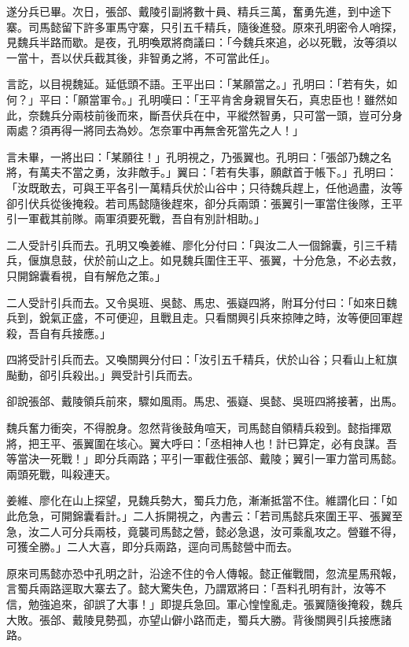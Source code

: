 遂分兵已畢。次日，張郃、戴陵引副將數十員、精兵三萬，奮勇先進，到中途下寨。司馬懿留下許多軍馬守寨，只引五千精兵，隨後進發。原來孔明密令人哨探，見魏兵半路而歇。是夜，孔明喚眾將商議曰：「今魏兵來追，必以死戰，汝等須以一當十，吾以伏兵截其後，非智勇之將，不可當此任」。

言訖，以目視魏延。延低頭不語。王平出曰：「某願當之。」孔明曰：「若有失，如何？」平曰：「願當軍令。」孔明嘆曰：「王平肯舍身親冒矢石，真忠臣也！雖然如此，奈魏兵分兩枝前後而來，斷吾伏兵在中，平縱然智勇，只可當一頭，豈可分身兩處？須再得一將同去為妙。怎奈軍中再無舍死當先之人！」

言未畢，一將出曰：「某願往！」孔明視之，乃張翼也。孔明曰：「張郃乃魏之名將，有萬夫不當之勇，汝非敵手。」翼曰：「若有失事，願獻首于帳下。」孔明曰：「汝既敢去，可與王平各引一萬精兵伏於山谷中；只待魏兵趕上，任他過盡，汝等卻引伏兵從後掩殺。若司馬懿隨後趕來，卻分兵兩頭：張翼引一軍當住後隊，王平引一軍截其前隊。兩軍須要死戰，吾自有別計相助。」

二人受計引兵而去。孔明又喚姜維、廖化分付曰：「與汝二人一個錦囊，引三千精兵，偃旗息鼓，伏於前山之上。如見魏兵圍住王平、張翼，十分危急，不必去救，只開錦囊看視，自有解危之策。」

二人受計引兵而去。又令吳班、吳懿、馬忠、張嶷四將，附耳分付曰：「如來日魏兵到，銳氣正盛，不可便迎，且戰且走。只看關興引兵來掠陣之時，汝等便回軍趕殺，吾自有兵接應。」

四將受計引兵而去。又喚關興分付曰：「汝引五千精兵，伏於山谷；只看山上紅旗颭動，卻引兵殺出。」興受計引兵而去。

卻說張郃、戴陵領兵前來，驟如風雨。馬忠、張嶷、吳懿、吳班四將接著，出馬。

魏兵奮力衝突，不得脫身。忽然背後鼓角喧天，司馬懿自領精兵殺到。懿指揮眾將，把王平、張翼圍在垓心。翼大呼曰：「丞相神人也！計已算定，必有良謀。吾等當決一死戰！」即分兵兩路；平引一軍截住張郃、戴陵；翼引一軍力當司馬懿。兩頭死戰，叫殺連天。

姜維、廖化在山上探望，見魏兵勢大，蜀兵力危，漸漸抵當不住。維謂化曰：「如此危急，可開錦囊看計。」二人拆開視之，內書云：「若司馬懿兵來圍王平、張翼至急，汝二人可分兵兩枝，竟襲司馬懿之營，懿必急退，汝可乘亂攻之。營雖不得，可獲全勝。」二人大喜，即分兵兩路，逕向司馬懿營中而去。

原來司馬懿亦恐中孔明之計，沿途不住的令人傳報。懿正催戰間，忽流星馬飛報，言蜀兵兩路逕取大寨去了。懿大驚失色，乃謂眾將曰：「吾料孔明有計，汝等不信，勉強追來，卻誤了大事！」即提兵急回。軍心惶惶亂走。張翼隨後掩殺，魏兵大敗。張郃、戴陵見勢孤，亦望山僻小路而走，蜀兵大勝。背後關興引兵接應諸路。

